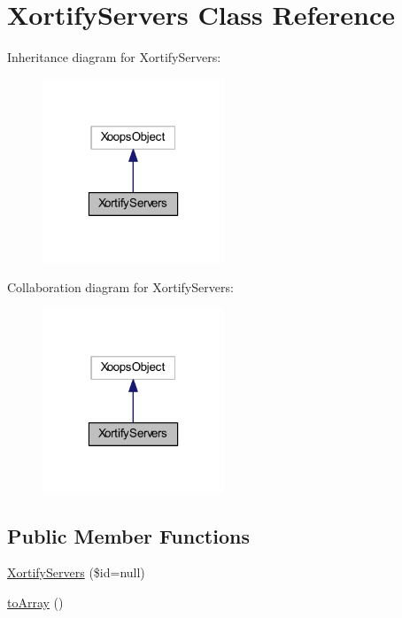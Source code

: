 \hypertarget{class_xortify_servers}{\section{Xortify\-Servers Class Reference}
\label{class_xortify_servers}
}


Inheritance diagram for Xortify\-Servers\-:
\nopagebreak
\begin{figure}[H]
\begin{center}
\leavevmode
\includegraphics[width=154pt]{class_xortify_servers__inherit__graph}
\end{center}
\end{figure}


Collaboration diagram for Xortify\-Servers\-:
\nopagebreak
\begin{figure}[H]
\begin{center}
\leavevmode
\includegraphics[width=154pt]{class_xortify_servers__coll__graph}
\end{center}
\end{figure}
\subsection*{Public Member Functions}
\begin{DoxyCompactItemize}
\item 
\hyperlink{class_xortify_servers_ab20b47ee40f09c78cbddcd47b1495de6}{Xortify\-Servers} (\$id=null)
\item 
\hyperlink{class_xortify_servers_a658defb34762c8f40085aec87e16ba1a}{to\-Array} ()
\end{DoxyCompactItemize}


